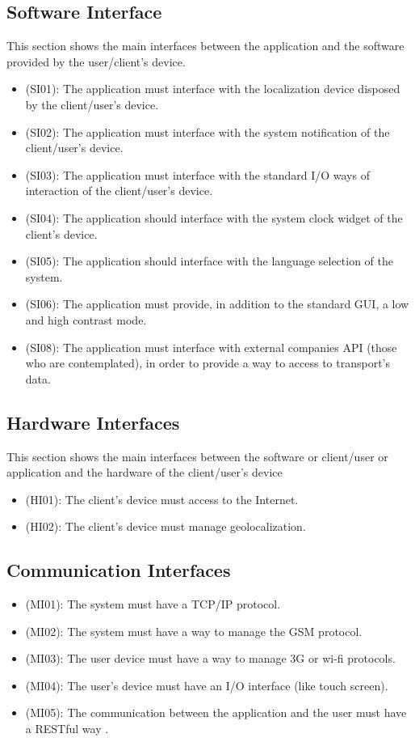 \documentclass[a4paper,leqno]{book}
\begin{document}
\subsection{Software Interface}
This section shows the main interfaces between the application and the software provided by the user/client's device.

\begin{itemize}
\item (SI01): The application must interface with the localization device disposed by the client/user's device.
\item (SI02): The application must interface with the system notification of the client/user's device.
\item (SI03): The application must interface with the standard I/O ways of interaction of the client/user's device.
\item (SI04): The application should interface with the system clock widget of the client's device.
\item (SI05): The application should interface with the language selection of the system.
\item (SI06): The application must provide, in addition to the standard GUI, a low and high contrast mode. 
\item (SI08): The application must interface with external companies API (those who are contemplated), in order to provide a way to access to transport's data.
\end{itemize}

\subsection{Hardware Interfaces}
This section shows the main interfaces between the software or client/user or application and the hardware of the client/user's device

\begin{itemize}
\item (HI01): The client's device must access to the Internet.
\item (HI02): The client's device must manage geolocalization. 
\end{itemize}

\subsection{Communication Interfaces}

\begin{itemize}
\item (MI01): The system must have a TCP/IP protocol.
\item (MI02): The system must have a way to manage the GSM protocol.
\item (MI03): The user device must have a way to manage 3G or wi-fi protocols.
\item (MI04): The user's device must have an I/O interface (like touch screen).
\item (MI05): The communication between the application and the user must have a RESTful way .
\end{itemize}
\end{document}
